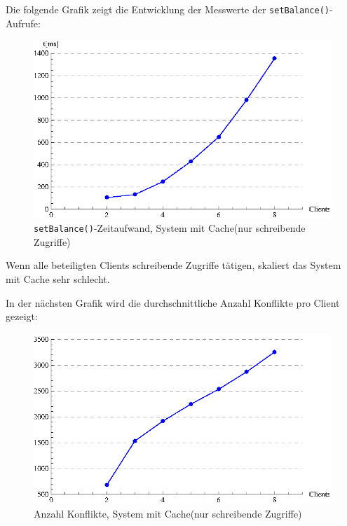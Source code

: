 Die folgende Grafik zeigt die Entwicklung der Messwerte der \texttt{set\-Balance()}-Aufrufe:
\begin{figure}[H]
\begin{center}
\includegraphics[width=\textwidth]{images_MessErgebnisse/incrementCacheSetBalance.eps}
\end{center}
\caption{\texttt{setBalance()}-Zeitaufwand, System mit Cache(nur schreibende Zugriffe)}
\end{figure}

Wenn alle beteiligten Clients schreibende Zugriffe tätigen, skaliert das System mit Cache sehr schlecht. 


In der nächsten Grafik wird die durchschnittliche Anzahl Konflikte pro Client gezeigt:
\begin{figure}[H]
\begin{center}
\includegraphics[width=\textwidth]{images_MessErgebnisse/incrementCacheKonfliktzahl.eps}
\end{center}
\caption{Anzahl Konflikte, System mit Cache(nur schreibende Zugriffe)}
\end{figure}

